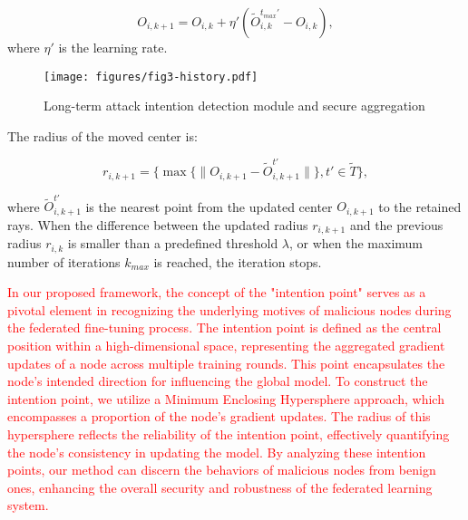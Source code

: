 \documentclass[lettersize,journal]{IEEEtran}
\begin{document}
\begin{equation}
O_{i,k+1} = O_{i,k} + \eta' (\tilde{O}_{i,k}^{t_{max}'}-O_{i,k}),
\end{equation}
where $\eta'$ is the learning rate. 

\begin{figure}[!ht]
    \centering
    \texttt{[image: figures/fig3-history.pdf]}
    \caption{Long-term attack intention detection module and secure aggregation}
    \label{fig3:longterm}
\end{figure}

The radius of the moved center is:

\begin{equation}
r_{i,k+1} =  \{ \max\{\| O_{i,k+1}-\tilde O_{i,k+1}^{t'} \|\}, t'\in \tilde T\} ,
\end{equation}



where $\tilde O_{i,k+1}^{t'}$ is the nearest point from the updated center $O_{i,k+1}$ to the retained rays. When the difference between the updated radius \( r_{i,k+1} \) and the previous radius \( r_{i,k} \) is smaller than a predefined threshold \( \lambda \), or when the maximum number of iterations $k_{max}$ is reached, the iteration stops.

\textcolor{red}{In our proposed framework, the concept of the "intention point" serves as a pivotal element in recognizing the underlying motives of malicious nodes during the federated fine-tuning process. The intention point is defined as the central position within a high-dimensional space, representing the aggregated gradient updates of a node across multiple training rounds. This point encapsulates the node's intended direction for influencing the global model. To construct the intention point, we utilize a Minimum Enclosing Hypersphere approach, which encompasses a proportion of the node’s gradient updates. The radius of this hypersphere reflects the reliability of the intention point, effectively quantifying the node's consistency in updating the model. By analyzing these intention points, our method can discern the behaviors of malicious nodes from benign ones, enhancing the overall security and robustness of the federated learning system.}
\end{document}
